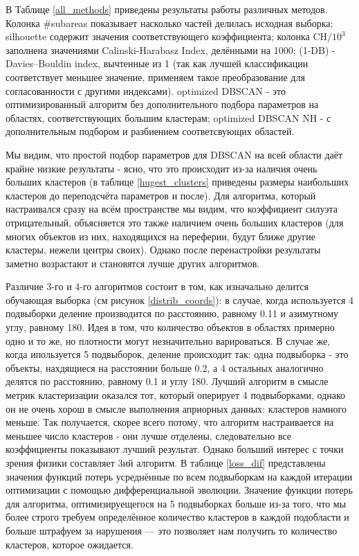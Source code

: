 \documentclass[12pt,fleqn]{article}
\begin{document}
 В Таблице \ref{all_methods} приведены результаты работы различных методов. Колонка \#subareas показывает насколько частей делилась исходная выборка; silhouette содержит значения соответствующего коэффициента; колонка CH$/10^3$ заполнена значениями Calinski-Harabasz Index, делёнными на 1000; (1-DB) - Davies–Bouldin index, вычтенные из 1 (так как лучшей классификации соответствует меньшее значение, применяем такое преобразование для согласованности с другими индексами). optimized DBSCAN - это оптимизированный алгоритм без дополнительного подбора параметров на областях, соответствующих большим кластерам; optimized DBSCAN NH - с дополнительным подбором и разбиением соответсвующих областей.

Мы видим, что простой подбор параметров для DBSCAN на всей области даёт крайне низкие результаты - ясно, что это происходит из-за наличия очень больших кластеров (в таблице \ref{hugest_clusters} приведены размеры наибольших кластеров до переподсчёта параметров и после). Для алгоритма, который настраивался сразу на всём пространстве мы видим, что коэффициент силуэта отрицательный, объясняется это также наличием очень больших кластеров (для многих объектов из них, находящихся на переферии, будут ближе другие кластеры, нежели центры своих).  Однако после перенастройки результаты заметно возрастают и становятся лучше других алгоритмов.

Различие 3-го и 4-го алгоритмов состоит в том, как изначально делится обучающая выборка (см рисунок \ref{distrib_coords}): в случае, когда используется 4 подвыборки деление производится по расстоянию, равному 0.11 и азимутному углу, равному 180. Идея в том, что количество объектов в областях примерно одно и то же, но плотности могут незначительно варироваться. В случае же, когда ипользуется 5 подвыборок, деление происходит так: одна подвыборка - это объекты, нахдящиеся на расстоянии больше 0.2, а 4 остальных аналогично делятся по расстоянию, равному 0.1 и углу 180. Лучший алгоритм в смысле метрик кластеризации оказался тот, который оперирует 4 подвыборками, однако он не очень хорош в смысле выполнения априорных данных: кластеров намного меньше. Так получается, скорее всего потому, что алгоритм настраивается на меньшее число кластеров - они лучше отделены, следовательно все коэффициенты показывают лучший результат. Однако больший интерес с точки зрения физики составляет 3ий алгоритм.
В таблице \ref{loss_dif} представлены значения функций потерь усреднённые по всем подвыборкам на каждой итерации оптимизации с помощью дифференциальной эволюции. Значение функции потерь для алгоритма, оптимизируещегося на 5 подвыборках больше из-за того, что мы более строго требуем определённое количество кластеров в каждой подобласти и больше штрафуем за нарушения --- это позволяет нам получить то количество кластеров, которое ожидается.
\end{document}
